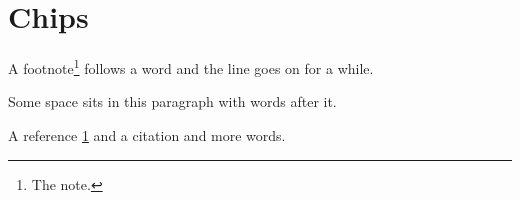 \documentclass{article}
\begin{document}
\section{Chips}\label{intro}

A footnote\footnote{The note.} follows a word and the line goes on for a while.

Some space \vspace{1em} sits in this paragraph with words after it.

A reference \ref{intro} and a citation \cite{knuth} and more words.
\end{document}
